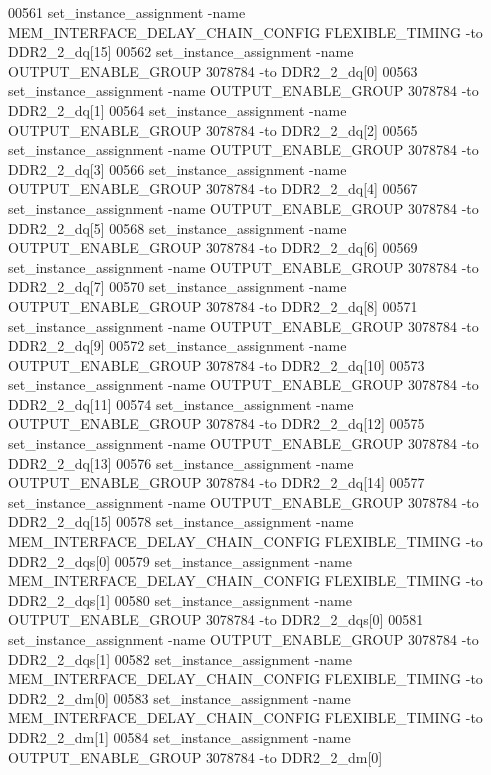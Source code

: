 \begin{DoxyCode}
00561 set\_instance\_assignment -name MEM\_INTERFACE\_DELAY\_CHAIN\_CONFIG FLEXIBLE\_TIMING -to DDR2\_2\_dq[15]
00562 set\_instance\_assignment -name OUTPUT\_ENABLE\_GROUP \textcolor{vhdllogic}{3078784} -to DDR2\_2\_dq[0]
00563 set\_instance\_assignment -name OUTPUT\_ENABLE\_GROUP \textcolor{vhdllogic}{3078784} -to DDR2\_2\_dq[1]
00564 set\_instance\_assignment -name OUTPUT\_ENABLE\_GROUP \textcolor{vhdllogic}{3078784} -to DDR2\_2\_dq[2]
00565 set\_instance\_assignment -name OUTPUT\_ENABLE\_GROUP \textcolor{vhdllogic}{3078784} -to DDR2\_2\_dq[3]
00566 set\_instance\_assignment -name OUTPUT\_ENABLE\_GROUP \textcolor{vhdllogic}{3078784} -to DDR2\_2\_dq[4]
00567 set\_instance\_assignment -name OUTPUT\_ENABLE\_GROUP \textcolor{vhdllogic}{3078784} -to DDR2\_2\_dq[5]
00568 set\_instance\_assignment -name OUTPUT\_ENABLE\_GROUP \textcolor{vhdllogic}{3078784} -to DDR2\_2\_dq[6]
00569 set\_instance\_assignment -name OUTPUT\_ENABLE\_GROUP \textcolor{vhdllogic}{3078784} -to DDR2\_2\_dq[7]
00570 set\_instance\_assignment -name OUTPUT\_ENABLE\_GROUP \textcolor{vhdllogic}{3078784} -to DDR2\_2\_dq[8]
00571 set\_instance\_assignment -name OUTPUT\_ENABLE\_GROUP \textcolor{vhdllogic}{3078784} -to DDR2\_2\_dq[9]
00572 set\_instance\_assignment -name OUTPUT\_ENABLE\_GROUP \textcolor{vhdllogic}{3078784} -to DDR2\_2\_dq[10]
00573 set\_instance\_assignment -name OUTPUT\_ENABLE\_GROUP \textcolor{vhdllogic}{3078784} -to DDR2\_2\_dq[11]
00574 set\_instance\_assignment -name OUTPUT\_ENABLE\_GROUP \textcolor{vhdllogic}{3078784} -to DDR2\_2\_dq[12]
00575 set\_instance\_assignment -name OUTPUT\_ENABLE\_GROUP \textcolor{vhdllogic}{3078784} -to DDR2\_2\_dq[13]
00576 set\_instance\_assignment -name OUTPUT\_ENABLE\_GROUP \textcolor{vhdllogic}{3078784} -to DDR2\_2\_dq[14]
00577 set\_instance\_assignment -name OUTPUT\_ENABLE\_GROUP \textcolor{vhdllogic}{3078784} -to DDR2\_2\_dq[15]
00578 set\_instance\_assignment -name MEM\_INTERFACE\_DELAY\_CHAIN\_CONFIG FLEXIBLE\_TIMING -to DDR2\_2\_dqs[0]
00579 set\_instance\_assignment -name MEM\_INTERFACE\_DELAY\_CHAIN\_CONFIG FLEXIBLE\_TIMING -to DDR2\_2\_dqs[1]
00580 set\_instance\_assignment -name OUTPUT\_ENABLE\_GROUP \textcolor{vhdllogic}{3078784} -to DDR2\_2\_dqs[0]
00581 set\_instance\_assignment -name OUTPUT\_ENABLE\_GROUP \textcolor{vhdllogic}{3078784} -to DDR2\_2\_dqs[1]
00582 set\_instance\_assignment -name MEM\_INTERFACE\_DELAY\_CHAIN\_CONFIG FLEXIBLE\_TIMING -to DDR2\_2\_dm[0]
00583 set\_instance\_assignment -name MEM\_INTERFACE\_DELAY\_CHAIN\_CONFIG FLEXIBLE\_TIMING -to DDR2\_2\_dm[1]
00584 set\_instance\_assignment -name OUTPUT\_ENABLE\_GROUP \textcolor{vhdllogic}{3078784} -to DDR2\_2\_dm[0]

\end{DoxyCode}
